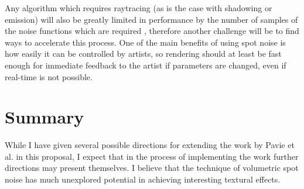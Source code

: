 \documentclass{article}
\begin{document}
Any algorithm which requires raytracing (as is the case with shadowing or emission) will also be greatly limited in performance by the number of samples of the noise functions which are required \cite{pavie:hal-02413269}, therefore another challenge will be to find ways to accelerate this process. One of the main benefits of using spot noise is how easily it can be controlled by artists, so rendering should at least be fast enough for immediate feedback to the artist if parameters are changed, even if real-time is not possible.

\section{Summary}

While I have given several possible directions for extending the work by Pavie et al. in this proposal, I expect that in the process of implementing the work further directions may present themselves. I believe that the technique of volumetric spot noise has much unexplored potential in achieving interesting textural effects.

\printbibliography
\end{document}
